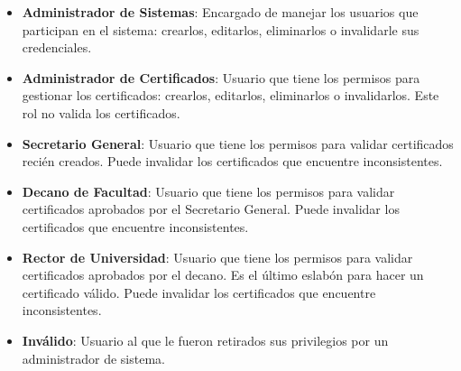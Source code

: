 \begin{itemize}
	\item \textbf{Administrador de Sistemas}: Encargado de manejar los usuarios que participan en el sistema: crearlos, editarlos, eliminarlos o invalidarle sus credenciales.
	\item \textbf{Administrador de Certificados}: Usuario que tiene los permisos para gestionar los certificados: crearlos, editarlos, eliminarlos o invalidarlos. Este rol no valida los certificados.
	\item \textbf{Secretario General}: Usuario que tiene los permisos para validar certificados recién creados. Puede invalidar los certificados que encuentre inconsistentes.
	\item \textbf{Decano de Facultad}: Usuario que tiene los permisos para validar certificados aprobados por el Secretario General. Puede invalidar los certificados que encuentre inconsistentes.
	\item \textbf{Rector de Universidad}: Usuario que tiene los permisos para validar certificados aprobados por el decano. Es el último eslabón para hacer un certificado válido. Puede invalidar los certificados que encuentre inconsistentes.
	\item \textbf{Inválido}: Usuario al que le fueron retirados sus privilegios por un administrador de sistema.
\end{itemize}

